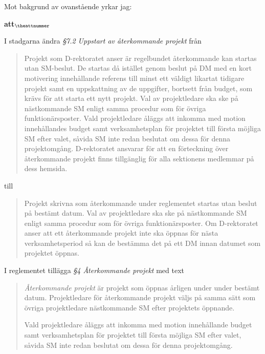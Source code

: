 \documentclass[a4paper]{article}
\begin{document}
	Mot bakgrund av ovanstående yrkar jag:

\setcounter{attnummer}{1}
\begin{list}{\bf att$_{\theattnummer}$}{}


\item I stadgarna ändra \textit{\S7.2 Uppstart av återkommande projekt} från
    \begin{quote}
        Projekt som D-rektoratet anser är regelbundet återkommande kan startas utan SM-beslut. De startas då istället genom beslut på DM med en kort motivering innehållande referens till minst ett väldigt likartat tidigare projekt samt en uppskattning av de uppgifter, bortsett från budget, som krävs för att starta ett nytt projekt. Val av projektledare ska ske på nästkommande SM enligt samma procedur som för övriga funktionärsposter. Vald projektledare åläggs att inkomma med motion innehållandes budget samt verksamhetsplan för projektet till första möjliga SM efter valet, såvida SM inte redan beslutat om dessa för denna projektomgång. D-rektoratet ansvarar för att en förteckning över återkommande projekt finns tillgänglig för alla sektionens medlemmar på dess hemsida.
    \end{quote}
    till
    \begin{quote}
        Projekt skrivna som återkommande under reglementet startas utan beslut på bestämt datum. Val av projektledare ska ske på nästkommande SM enligt samma procedur som för övriga funktionärsposter. Om D-rektoratet anser att ett återkommande projekt inte ska öppnas för nästa verksamhetsperiod så kan de bestämma det på ett DM innan datumet som projektet öppnas.
    \end{quote}


\item I reglementet tillägga \textit{\S4 Återkommande projekt} med text
    \begin{quote}
        \textit{Återkommande projekt} är projekt som öppnas årligen under under bestämt datum.
        Projektledare för återkommande projekt väljs på samma sätt som övriga projektledare
        nästkommande SM efter projektets öppnande.

        Vald projektledare åläggs att inkomma med motion innehållande budget samt
        verksamhetsplan för projektet till första möjliga SM efter valet, såvida SM inte
        redan beslutat om dessa för denna projektomgång.


\end{quote}
\end{list}
\end{document}
